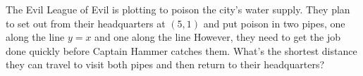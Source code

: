 The Evil League of Evil is plotting to poison the city's water supply. They plan to set out from their headquarters at $(5, 1)$ and put poison in two pipes, one along the line $y=x$ and one along the line  However, they need to get the job done quickly before Captain Hammer catches them. What's the shortest distance they can travel to visit both pipes and then return to their headquarters?